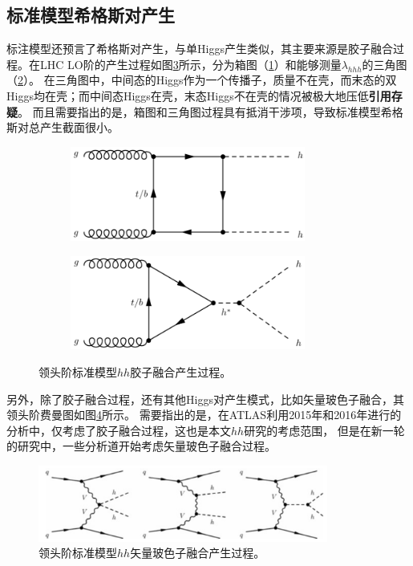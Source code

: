 \subsection{标准模型希格斯对产生}
标注模型还预言了希格斯对产生，与单Higgs产生类似，其主要来源是胶子融合过程。在LHC LO阶的产生过程如图\ref{fig:diagram_SMhh_ggF}所示，分为箱图（\ref{fig:diagram_SMhh_box}）和能够测量$\lambda_{hhh}$的三角图（\ref{fig:diagram_SMhh_triangle}）。
在三角图中，中间态的Higgs作为一个传播子，质量不在壳，而末态的双Higgs均在壳；而中间态Higgs在壳，末态Higgs不在壳的情况被极大地压低\cite{Patrignani:2016xqp}\textbf{引用存疑}。
而且需要指出的是，箱图和三角图过程具有抵消干涉项，导致标准模型希格斯对总产生截面很小。
\begin{figure}[h]
\centering
 \begin{subfigure}[b]{0.45\textwidth}
  \includegraphics[width=0.85\textwidth]{fig/SMhh_box.png}
  \caption{}
  \label{fig:diagram_SMhh_box}
 \end{subfigure}
 \begin{subfigure}[b]{0.45\textwidth}
  \includegraphics[width=0.85\textwidth]{fig/SMhh_triangle.png}
  \caption{}
  \label{fig:diagram_SMhh_triangle}
 \end{subfigure}
\caption{领头阶标准模型$hh$胶子融合产生过程。}
\label{fig:diagram_SMhh_ggF}
\end{figure}

另外，除了胶子融合过程，还有其他Higgs对产生模式，比如矢量玻色子融合，其领头阶费曼图如图\ref{fig:diagram_SMhh_VBF}所示。
需要指出的是，在ATLAS利用2015年和2016年进行的分析中，仅考虑了胶子融合过程，这也是本文$hh$研究的考虑范围，
但是在新一轮的研究中，一些分析道开始考虑矢量玻色子融合过程。
\begin{figure}[h]
\centering
  \includegraphics[width=0.85\textwidth]{fig/SMhh_VBF.png}
\caption{领头阶标准模型$hh$矢量玻色子融合产生过程。}
\label{fig:diagram_SMhh_VBF}
\end{figure}

